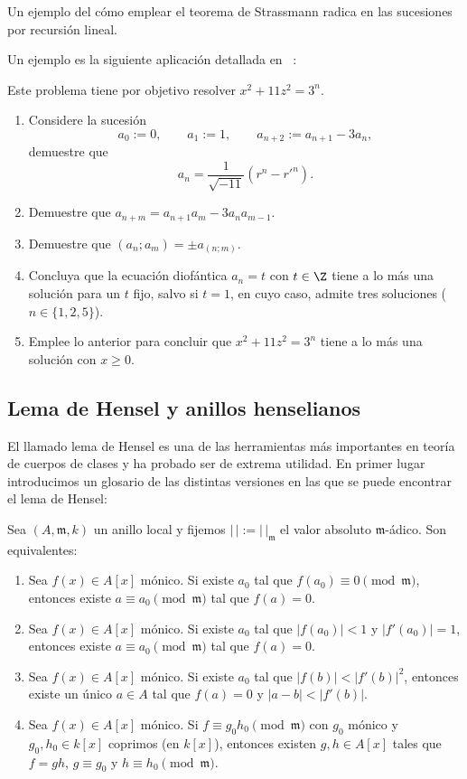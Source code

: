 \documentclass[teoria-numeros.tex]{subfiles}
\begin{document}
Un ejemplo del cómo emplear el teorema de Strassmann radica en las sucesiones por recursión lineal.

Un ejemplo es la siguiente aplicación detallada en \citeauthor{alter75diophantine}~\cite{alter75diophantine}:
\begin{prob}
	Este problema tiene por objetivo resolver $x^2 + 11z^2 = 3^n$.
	\begin{enumerate}
		\item Considere la sucesión
			$$ a_0 := 0, \qquad a_1 := 1, \qquad a_{n+2} := a_{n+1} - 3a_n, $$
			demuestre que
			$$ a_n = \frac{1}{\sqrt{-11}}(r^n - r'^n). $$
		\item Demuestre que $a_{n+m} = a_{n+1}a_m - 3a_na_{m-1}$.
		\item Demuestre que $(a_n; a_m) = \pm a_{(n; m)}$.
		\item Concluya que la ecuación diofántica $a_n = t$ con $t \in \Z$ tiene a lo más una solución para un $t$ fijo,
			salvo si $t = 1$, en cuyo caso, admite tres soluciones ($n \in \{ 1, 2, 5 \}$).
		\item Emplee lo anterior para concluir que $x^2 + 11z^2 = 3^n$ tiene a lo más una solución con $x \ge 0$.
	\end{enumerate}
\end{prob}


\subsection{Lema de Hensel y anillos henselianos}
El llamado lema de Hensel es una de las herramientas más importantes en teoría de cuerpos de clases y ha probado ser de extrema utilidad.
En primer lugar introducimos un glosario de las distintas versiones en las que se puede encontrar el lema de Hensel:
\begin{thm}
	Sea $(A, \mathfrak{m}, k)$ un anillo local y fijemos $|\,| := |\,|_{\mathfrak{m}}$ el valor absoluto $\mathfrak{m}$-ádico.
	Son equivalentes:
	\begin{enumerate}
		\item Sea $f(x) \in A[x]$ mónico.
			Si existe $a_0$ tal que $f(a_0) \equiv 0 \pmod{\mathfrak{m}}$,
			entonces existe $a \equiv a_0 \pmod{\mathfrak{m}}$ tal que $f(a) = 0$.
		\item Sea $f(x) \in A[x]$ mónico.
			Si existe $a_0$ tal que $|f(a_0)| < 1$ y $|f'(a_0)| = 1$,
			entonces existe $a \equiv a_0 \pmod{\mathfrak{m}}$ tal que $f(a) = 0$.
		\item Sea $f(x) \in A[x]$ mónico.
			Si existe $a_0$ tal que $|f(b)| < |f'(b)|^2$,
			entonces existe un único $a \in A$ tal que $f(a) = 0$ y $|a - b| < |f'(b)|$.
		\item Sea $f(x) \in A[x]$ mónico.
			Si $f \equiv g_0h_0 \pmod{\mathfrak{m}}$ con $g_0$ mónico y $g_0, h_0 \in k[x]$ coprimos (en $k[x]$),
			entonces existen $g, h \in A[x]$ tales que $f = gh$, $g \equiv g_0$ y $h \equiv h_0 \pmod{\mathfrak{m}}$.
	\end{enumerate}
\end{thm}
\end{document}
